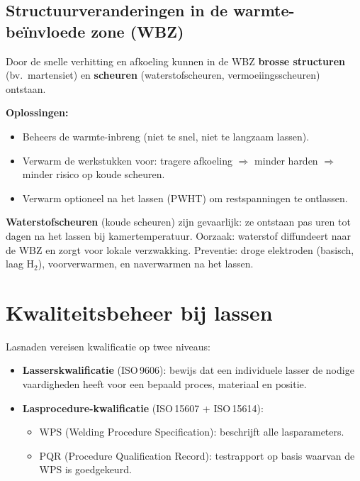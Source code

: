\subsection{Structuurveranderingen in de warmte-beïnvloede zone (WBZ)}

Door de snelle verhitting en afkoeling kunnen in de WBZ \textbf{brosse structuren} (bv.\ martensiet)
en \textbf{scheuren} (waterstofscheuren, vermoeiingsscheuren) ontstaan.

\textbf{Oplossingen:}
\begin{itemize}
  \item Beheers de warmte-inbreng (niet te snel, niet te langzaam lassen).
  \item Verwarm de werkstukken voor: tragere afkoeling $\Rightarrow$ minder harden $\Rightarrow$
    minder risico op koude scheuren.
  \item Verwarm optioneel na het lassen (PWHT) om restspanningen te ontlassen.
\end{itemize}

\begin{warningbox}
\textbf{Waterstofscheuren} (koude scheuren) zijn gevaarlijk: ze ontstaan pas uren tot
dagen na het lassen bij kamertemperatuur.  Oorzaak: waterstof diffundeert naar de WBZ en
zorgt voor lokale verzwakking.  Preventie: droge elektroden (basisch, laag H$_2$), voorverwarmen,
en naverwarmen na het lassen.
\end{warningbox}

\section{Kwaliteitsbeheer bij lassen}

Lasnaden vereisen kwalificatie op twee niveaus:
\begin{itemize}
  \item \textbf{Lasserskwalificatie} (ISO\,9606): bewijs dat een individuele lasser de nodige
    vaardigheden heeft voor een bepaald proces, materiaal en positie.
  \item \textbf{Lasprocedure-kwalificatie} (ISO\,15607 + ISO\,15614):
    \begin{itemize}
      \item WPS (Welding Procedure Specification): beschrijft alle lasparameters.
      \item PQR (Procedure Qualification Record): testrapport op basis waarvan de WPS
        is goedgekeurd.
    \end{itemize}
\end{itemize}

